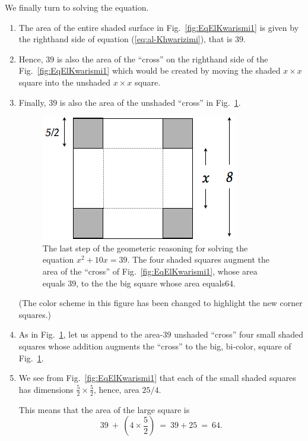 We finally turn to solving the equation.
\begin{enumerate}
\item
The area of the entire shaded surface in Fig.~\ref{fig:EqElKwarismi1}
is given by the righthand side of equation (\ref{eq:al-Khwarizimi}),
that is $39$.
\item
Hence, $39$ is also the area of the ``cross'' on the righthand side of
the Fig.~\ref{fig:EqElKwarismi1} which would be created by moving the
shaded $x \times x$ square into the unshaded $x \times x$ square.
\item
Finally, $39$ is also the area of the unshaded ``cross'' in
Fig.~\ref{fig:EqElKwarismi2}.
\begin{figure}[ht]
\begin{center}
       \includegraphics[scale=0.4]{FiguresArithmetic/EquationElKwarismi2}
\caption{The last step of the geometeric reasoning for solving the
  equation $x^2 + 10x = 39$.  The four shaded squares augment the area
  of the ``cross'' of Fig.~\ref{fig:EqElKwarismi1}, whose area equals
  $39$, to the the big square whose area equals$64$.}
       \label{fig:EqElKwarismi2}
\end{center}
\end{figure}
(The color scheme in this figure has been changed to highlight the new
corner squares.)

\item
As in Fig.~\ref{fig:EqElKwarismi2}, let us append to the area-$39$
unshaded ``cross'' four small shaded squares whose addition augments
the ``cross'' to the big, bi-color, square of
Fig.~\ref{fig:EqElKwarismi2}.

\item
We see from Fig.~\ref{fig:EqElKwarismi1} that each of the small
shaded squares has dimensions $\frac{5}{2} \times \frac{5}{2}$, hence,
area $25/4$.

This means that the area of the large square is
\[ 39 \ + \ \left( 4 \times \frac{5}{2} \right) \ = \ 39 + 25 \ =
\ 64. \]
\end{enumerate}

